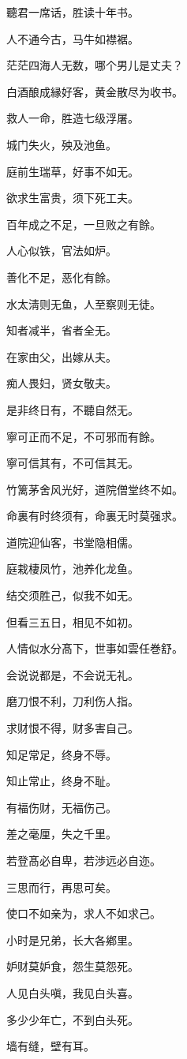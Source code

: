 \documentclass[12pt,oneside]{book}
\begin{document}
聽君一席话，胜读十年书。

人不通今古，马牛如襟裾。

茫茫四海人无数，哪个男儿是丈夫？

白酒酿成縁好客，黄金散尽为收书。

救人一命，胜造七级浮屠。

城门失火，殃及池鱼。

庭前生瑞草，好事不如无。

欲求生富贵，须下死工夫。

百年成之不足，一旦败之有餘。

人心似铁，官法如炉。

善化不足，恶化有餘。

水太淸则无鱼，人至察则无徒。

知者减半，省者全无。

在家由父，出嫁从夫。

痴人畏妇，贤女敬夫。

是非终日有，不聽自然无。

寧可正而不足，不可邪而有餘。

寧可信其有，不可信其无。

竹篱茅舍风光好，道院僧堂终不如。

命裏有时终须有，命裏无时莫强求。

道院迎仙客，书堂隐相儒。

庭栽棲凤竹，池养化龙鱼。

结交须胜己，似我不如无。

但看三五日，相见不如初。

人情似水分髙下，世事如雲任巻舒。

会说说都是，不会说无礼。

磨刀恨不利，刀利伤人指。

求财恨不得，财多害自己。

知足常足，终身不辱。

知止常止，终身不耻。

有福伤财，无福伤己。

差之毫厘，失之千里。

若登髙必自卑，若渉远必自迩。

三思而行，再思可矣。

使口不如亲为，求人不如求己。

小时是兄弟，长大各鄕里。

妒财莫妒食，怨生莫怨死。

人见白头嗔，我见白头喜。

多少少年亡，不到白头死。

墙有缝，壁有耳。
\end{document}
